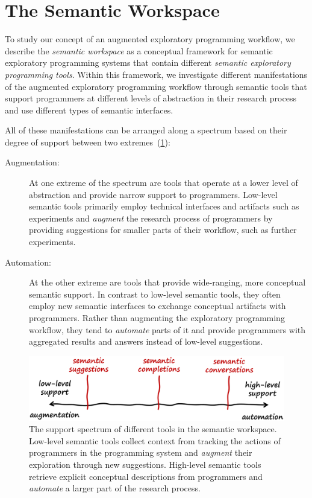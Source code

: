 
\section{The Semantic Workspace}
\label{sec:approach/workspace}

To study our concept of an augmented exploratory programming workflow, we describe the \emph{semantic workspace} as a conceptual framework for semantic exploratory programming systems that contain different \emph{semantic exploratory programming tools}.
Within this framework, we investigate different manifestations of the augmented exploratory programming workflow through semantic tools that support programmers at different levels of abstraction in their research process and use different types of semantic interfaces.

All of these manifestations can be arranged along a spectrum based on their degree of support between two extremes~(\cref{fig:approach/workspace/spectrum}):

\begin{description}
	\item[Augmentation:]
	At one extreme of the spectrum are tools that operate at a lower level of abstraction and provide narrow support to programmers.
	Low-level semantic tools primarily employ technical interfaces and artifacts such as experiments and \emph{augment} the research process of programmers by providing suggestions for smaller parts of their workflow, such as further experiments.

	\item[Automation:]
	At the other extreme are tools that provide wide-ranging, more conceptual semantic support.
	In contrast to low-level semantic tools, they often employ new semantic interfaces to exchange conceptual artifacts with programmers.
	Rather than augmenting the exploratory programming workflow, they tend to \emph{automate} parts of it and provide programmers with aggregated results and answers instead of low-level suggestions.
\end{description}

\begin{figure}[h]
	\centering
	\includegraphics[width=.85\textwidth]{02_workspace/spectrum.png}
	\caption[The support spectrum of different \emph{semantic tools} in the semantic workspace.]{
		The support spectrum of different tools in the semantic workspace.
		Low-level semantic tools collect context from tracking the actions of programmers in the programming system and \emph{augment} their exploration through new suggestions.
		High-level semantic tools retrieve explicit conceptual descriptions from programmers and \emph{automate} a larger part of the research process.
	}
	\label{fig:approach/workspace/spectrum}
\end{figure}

